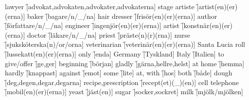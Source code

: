 \begin{questions}
    \begin{multicols}{2}
        \raggedcolumns
        \question lawyer \f[advokat,advokaten,advokater,advokaterna]
        \question stage artiste \f[artist(en)(er)(erna)]
        \question baker \f[bagare/n/\_/na]
        \question hair dresser \f[frisör(en)(er)(erna)]
        \question author \f[författare/n/\_/na]
        \question engineer \f[ingenjör(en)(er)(erna)]
        \question artist \f[konstnär(en)(er)(erna)]
        \question doctor \f[läkare/n/\_/na]
        \question priest \f[präste(n)(r)(rna)]
        \question nurse \f[sjuksköterska(n)/or/orna]
        \question veterinarian \f[veterinär(en)(er)(erna)]
        \question Santa Lucia roll \f[lussekatt(en)(er)(erna)]
        \question only \f[enda]
        \question Germany \f[Tyskland]
        \question Italy \f[Italien]
        \question to give/offer \f[ge,ger]
        \question beginning \f[början]
        \question gladly \f[gärna,hellre,helst]
        \question at home \f[hemma]
        \question hardly \f[knappast]
        \question against \f[emot]
        \question some \f[lite]
        \question at, with \f[hos]
        \question both \f[både]
        \question dough \f[deg,degen,degar,degarna]
        \question recipe,prescription \f[recept(et)(\_)(en)]
        \question cell telephone \f[mobil(en)(er)(erna)]
        \question yeast \f[jäst(en)]
        \question sugar \f[socker,sockret]
        \question milk \f[mjölk/mjölken]
    \end{multicols}
\end{questions}
